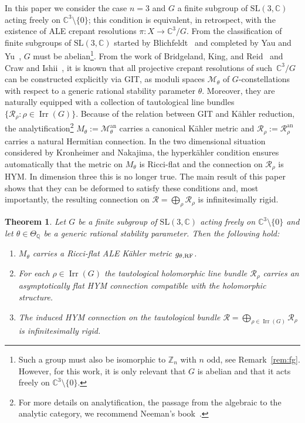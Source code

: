 \documentclass[10pt,a4paper]{amsart}
\numberwithin{equation}{section}
\newcommand{\cR}{\mathcal{R}}
\newcommand{\sM}{\mathscr{M}}
\newcommand{\sR}{\mathscr{R}}
\newcommand{\Z}{{\mathbb Z}}
\newcommand{\Q}{{\mathbb Q}}
\newcommand{\C}{{\mathbb C}}
\newcommand{\SL}{\mathrm{SL}}
\newcommand{\Irr}{\operatorname{Irr}}
\newcommand{\an}{\mathrm{an}}
\newtheorem{Theorem}{Theorem}[section]
\begin{document}
In this paper we consider the case $n=3$ and $G$ a f\/inite subgroup of $\SL(3,\C)$ acting freely on $\C^3{\setminus} \{0\}$;
this condition is equivalent, in retrospect, with the existence of ALE crepant resolutions $\pi\colon X \to \C^3\!/G$.
From the classif\/ication of f\/inite subgroups of $\SL(3,\C)$ started by Blichfeldt~\cite{Blichfeldt1917} and completed by Yau and Yu~\cite{Yau-Stephan1993}, $G$ must be abelian\footnote{Such a group must also be isomorphic to $\Z_n$ with $n$ odd, see Remark~\ref{rem:fg}. However, for this work, it is only relevant that $G$ is abelian and that it acts freely on $\C^3{\setminus} \{0\}$.}.
From the work of Bridgeland, King, and Reid~\cite{Bridgeland2001} and Craw and
Ishii~\cite{Craw2004}, it is known that all projective crepant
resolutions of such~$\C^3\!/G$ can be constructed explicitly via GIT,
as moduli spaces $\sM_\theta$ of $G$-constellations with respect to a
generic rational stability parameter $\theta$.
Moreover, they are naturally equipped with a collection of tautological line bundles $\{ \sR_\rho\colon \rho \in \Irr(G) \}$.
Because of the relation between GIT and K\"ahler reduction, the
analytif\/ication\footnote{For
  more details on analytif\/ication, the passage from the algebraic to the analytic category, we recommend Neeman's book~\cite{Neeman2007}.} $M_\theta := \sM_\theta^\an$ carries a canonical
K\"ahler metric and $\cR_\rho := \sR_\rho^\an$ carries a natural
Hermitian connection.
In the two dimensional situation considered by Kronheimer and
Nakajima, the hyperk\"ahler condition ensures automatically that the
metric on $M_\theta$ is Ricci-f\/lat and the connection on $\cR_\rho$ is
HYM. In dimension three this is no longer true.
The main result of this paper shows that they can be deformed to satisfy these conditions and, most importantly, the resulting connection on $\cR = \bigoplus_\rho \cR_\rho$ is inf\/initesimally rigid.

\begin{Theorem}
  \label{Thm_KRF_HYM}
  Let $G$ be a finite subgroup of $\SL(3, \C)$ acting freely on $\C^3{\setminus}\{0\}$ and let $\theta\in \Theta_{\Q}$ be a generic rational stability parameter.
  Then the following hold:
  \begin{enumerate}\itemsep=0pt
  \item[$(1)$]
    $M_\theta$ carries a Ricci-flat ALE K\"ahler metric $g_{\theta, \rm RF}$.
  \item[$(2)$]
    For each $\rho \in \Irr(G)$ the tautological holomorphic line bundle $\cR_{\rho}$ carries an asymptotically flat HYM connection compatible with the holomorphic structure.
  \item[$(3)$]
    The induced HYM connection on the tautological bundle $\cR=\bigoplus_{\rho\in\Irr(G)}\cR_\rho$ is infinitesimally rigid.
  \end{enumerate}
\end{Theorem}
\end{document}
